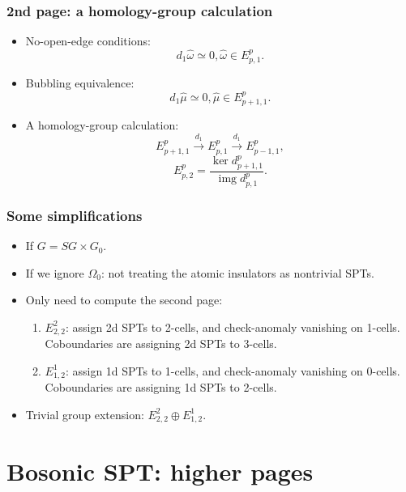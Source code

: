 \documentclass[xcolor=table, 10pt, aspectratio=43]{beamer}
\DeclareMathOperator{\img}{img}
\begin{document}
\begin{frame}
\frametitle{2nd page: a homology-group calculation}
\begin{itemize}
\item No-open-edge conditions:
\[d_1\hat\omega\simeq 0, \hat\omega\in E^p_{p,1}.\]
\item Bubbling equivalence:
\[d_1\hat\mu\simeq 0, \hat\mu\in E^p_{p+1,1}.\]
\item A homology-group calculation:
\[E^p_{p+1,1}\xrightarrow{d_1}E^p_{p,1}\xrightarrow{d_1}E^p_{p-1,1},\]
\[E^p_{p,2}=\frac{\ker d^p_{p+1,1}}{\img d^p_{p,1}}.\]
\end{itemize}
\end{frame}

\begin{frame}
\frametitle{Some simplifications}
\begin{itemize}
\item If $G = SG\times G_0$.
\item If we ignore $\Omega_0$: not treating the atomic insulators as nontrivial SPTs.
\item Only need to compute the second page:
\begin{enumerate}
\item $E^2_{2,2}$: assign 2d SPTs to 2-cells, and check-anomaly vanishing on 1-cells. Coboundaries are assigning 2d SPTs to 3-cells.
\item $E^1_{1,2}$: assign 1d SPTs to 1-cells, and check-anomaly vanishing on 0-cells. Coboundaries are assigning 1d SPTs to 2-cells.
\end{enumerate}
\item Trivial group extension: $E^2_{2,2}\oplus E^1_{1,2}$.
\end{itemize}
\end{frame}



\section{Bosonic SPT: higher pages}
\end{document}
